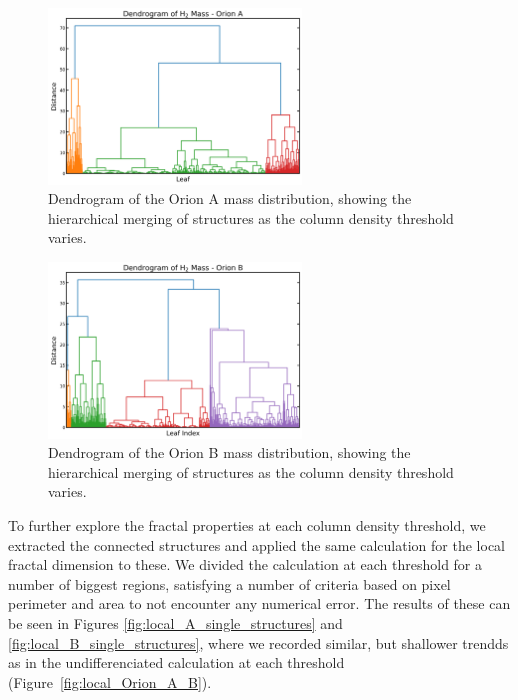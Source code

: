 \begin{figure}[t]
    \centering
    \includegraphics[width=0.6\textwidth]{figures/dendogram_A.png}
    \caption{Dendrogram of the Orion A mass distribution, showing the hierarchical merging of structures as the column density threshold varies.}
    \label{fig:dendrogram_A}
\end{figure}

\begin{figure}[t]
    \centering
    \includegraphics[width=0.6\textwidth]{figures/dendogram_B.png}
    \caption{Dendrogram of the Orion B mass distribution, showing the hierarchical merging of structures as the column density threshold varies.}
    \label{fig:dendrogram_B}
\end{figure}

To further explore the fractal properties at each column density threshold, we extracted the connected structures and applied the same calculation for the local fractal dimension to these.
We divided the calculation at each threshold for a number of biggest regions, satisfying a number of criteria based on pixel perimeter and area to not encounter any numerical error.
The results of these can be seen in Figures \ref{fig:local_A_single_structures} and \ref{fig:local_B_single_structures}, where we recorded similar, but shallower trendds as in the undifferenciated calculation at each threshold (Figure~\ref{fig:local_Orion_A_B}).

